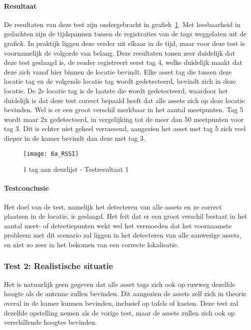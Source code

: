 \paragraph{Resultaat}
De resultaten van deze test zijn ondergebracht in grafiek~\ref{fig:ond-rfid-dynamic-6a-res}. Met leesbaarheid in gedachten zijn de tijdspannen tussen de registraties van de tags weggelaten uit de grafiek. In praktijk liggen deze verder uit elkaar in de tijd, maar voor deze test is voornamelijk de volgorde van belang. Deze resultaten tonen zeer duidelijk dat deze test geslaagd is, de reader registreert eerst tag 4, welke duidelijk maakt dat deze zich vanaf hier binnen de locatie bevindt. Elke asset tag die tussen deze locatie tag en de volgende locatie tag wordt gedetecteerd, bevindt zich in deze locatie. De 2e locatie tag is de laatste die wordt gedetecteerd, waardoor het duidelijk is dat deze test correct bepaald heeft dat alle assets zich op deze locatie bevinden. Wel is er een groot verschil merkbaar in het aantal meetpunten. Tag 5 wordt maar 2x gedetecteerd, in vergelijking tot de meer dan 50 meetpunten voor tag 3. Dit is echter niet geheel verrassend, aangezien het asset met tag 5 zich veel dieper in de kamer bevindt dan deze met tag 3.

\begin{figure}[h]
	\texttt{[image: 6a\_RSSI]}
	\caption{1 tag aan deurlijst - Testresultaat 1}
	\label{fig:ond-rfid-dynamic-6a-res}
\end{figure}

\paragraph{Testconclusie}
Het doel van de test, namelijk het detecteren van alle assets en ze correct plaatsen in de locatie, is geslaagd. Het feit dat er een groot verschil bestaat in het aantal meet- of detectiepunten wekt wel het vermoeden dat het voornaamste probleem met dit scenario zal liggen in het detecteren van alle aanwezige assets, en niet zo zeer in het bekomen van een correcte lokalisatie.

\subsubsection{Test 2: Realistische situatie}
\label{sec:ond-rfid-4-2}
Het is natuurlijk geen gegeven dat alle asset tags zich ook op ruwweg dezelfde hoogte als de antenne zullen bevinden. Dit aangezien de assets zelf zich in theorie overal in de kamer kunnen bevinden, inclusief op tafels of kasten. Deze test zal dezelfde opstelling nemen als de vorige test, maar de assets zullen zich ook op verschillende hoogtes bevinden.

